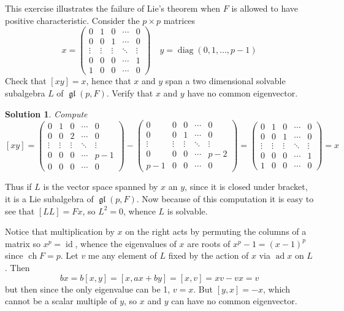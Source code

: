 \documentclass[12pt]{article}
\newenvironment{hwprob}[1]
{\renewcommand{\theprob}{#1}%
 \addtocounter{thm}{-1}%
 \begin{prob}}
{\end{prob}}
\theoremstyle{nonumberbreak}
\newtheorem{sol}{Solution}
\theoremstyle{changebreak}
\theoremstyle{nonumberbreak}
\theoremstyle{change}
\DeclareMathOperator{\ch}{ch}
\DeclareMathOperator{\id}{id}
\DeclareMathOperator{\gl}{\mathfrak{gl}}
\DeclareMathOperator{\ad}{ad}
\DeclareMathOperator{\diag}{diag}
\begin{document}
\begin{hwprob}{4.3}
	This exercise illustrates the failure of Lie's theorem when $F$ is allowed to have positive characteristic.
	Consider the $p\times p$ matrices
	\[x=\begin{pmatrix} 
		0 & 1 & 0 & \cdots & 0\\
		0 & 0 & 1 & \cdots & 0\\
		\vdots & \vdots & \vdots & \ddots & \vdots\\
		0 & 0 & 0 & \cdots & 1\\
		1 & 0 & 0 & \cdots & 0
	\end{pmatrix}\quad y=\diag(0,1,\dots, p-1)\]
	Check that $[xy]=x$, hence that $x$ and $y$ span a two dimensional solvable subalgebra $L$ of $\gl(p,F)$. Verify that $x$ and $y$ have no common eigenvector.
\end{hwprob}
\begin{sol}
	Compute
	\[[xy]=\begin{pmatrix} 
		0 & 1 & 0 & \cdots & 0\\
		0 & 0 & 2 & \cdots & 0\\
		\vdots & \vdots & \vdots & \ddots & \vdots\\
		0 & 0 & 0 & \cdots & p-1\\
		0 & 0 & 0 & \cdots & 0
	\end{pmatrix}-\begin{pmatrix} 
		0 & 0 & 0 & \cdots & 0\\
		0 & 0 & 1 & \cdots & 0\\
		\vdots & \vdots & \vdots & \ddots & \vdots\\
		0 & 0 & 0 & \cdots & p-2\\
		p-1 & 0 & 0 & \cdots & 0
	\end{pmatrix}=\begin{pmatrix} 
		0 & 1 & 0 & \cdots & 0\\
		0 & 0 & 1 & \cdots & 0\\
		\vdots & \vdots & \vdots & \ddots & \vdots\\
		0 & 0 & 0 & \cdots & 1\\
		1 & 0 & 0 & \cdots & 0
	\end{pmatrix}=x\]
\end{sol}
Thus if $L$ is the vector space spanned by $x$ an $y$, since it is closed under bracket, 
it is a Lie subalgebra of $\gl(p,F)$. Now because of this computation it is easy to see that
$[LL]=Fx$, so $L^2=0$, whence $L$ is solvable.

Notice that multiplication by $x$ on the right acts by permuting the columns of a matrix so $x^p=\id$,
whence the eigenvalues of $x$ are roots of $x^p-1=(x-1)^p$ since $\ch F=p$. Let $v$ me any element of $L$ 
fixed by the action of $x$ via $\ad x$ on $L$. Then
\[bx=b[x,y]=[x,ax+by]=[x,v]=xv-vx=v\]
but then since the only eigenvalue can be 1, $v=x$. But $[y,x]=-x$, which cannot be a scalar multiple of $y$,
so $x$ and $y$ can have no common eigenvector.
\newpage
\end{document}
